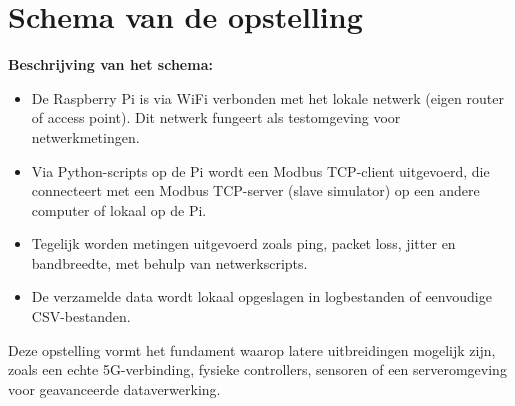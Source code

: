 \section{Schema van de opstelling}
%

\textbf{Beschrijving van het schema:}
\begin{itemize}
    \item De Raspberry Pi is via WiFi verbonden met het lokale netwerk (eigen router of access point). Dit netwerk fungeert als testomgeving voor netwerkmetingen.
    \item Via Python-scripts op de Pi wordt een Modbus TCP-client uitgevoerd, die connecteert met een Modbus TCP-server (slave simulator) op een andere computer of lokaal op de Pi.
    \item Tegelijk worden metingen uitgevoerd zoals ping, packet loss, jitter en bandbreedte, met behulp van netwerkscripts.
    \item De verzamelde data wordt lokaal opgeslagen in logbestanden of eenvoudige CSV-bestanden.
\end{itemize}

Deze opstelling vormt het fundament waarop latere uitbreidingen mogelijk zijn, zoals een echte 5G-verbinding, fysieke controllers, sensoren of een serveromgeving voor geavanceerde dataverwerking.

